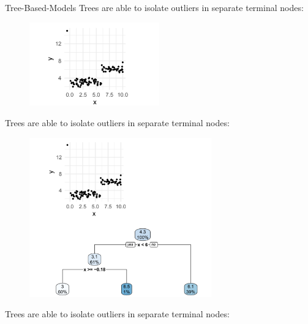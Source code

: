 \begin{vbframe}{Tree-Based-Models}
    Trees are able to isolate outliers in separate terminal nodes:
    \vspace{+.4cm}
    
    \begin{figure}
        \includegraphics[width = 0.5\textwidth]{figure_man/tree-based01.png}
    \end{figure}
    
    \framebreak
    
    Trees are able to isolate outliers in separate terminal nodes:
    
    \vspace{-0.3cm}
    \begin{figure}
        \includegraphics[width = 0.7\textwidth]{figure_man/tree-based02.png}
    \end{figure}
    
    \framebreak
    
    Trees are able to isolate outliers in separate terminal nodes:
    

\end{vbframe}
